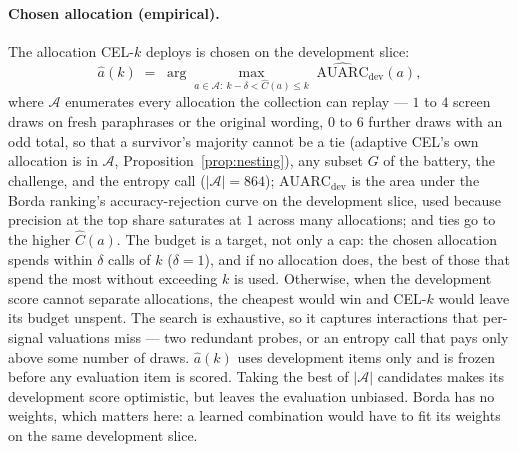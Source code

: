 \documentclass[11pt]{article}
\begin{document}
\paragraph{Chosen allocation (empirical).} The allocation CEL-$k$
deploys is chosen on the development slice:
\begin{equation}
  \hat a(k) \;=\; \arg\max_{a \in \mathcal{A}:\ k - \delta < \hat C(a) \le k}\;
  \widehat{\mathrm{AUARC}}_{\mathrm{dev}}(a),
  \label{eq:devalloc}
\end{equation}
where $\mathcal{A}$ enumerates every allocation the collection can
replay --- $1$ to $4$ screen draws on fresh paraphrases or the original
wording, $0$ to $6$ further draws with an odd total, so that a
survivor's majority cannot be a tie (adaptive CEL's own allocation is
in $\mathcal{A}$, Proposition~\ref{prop:nesting}), any subset $G$ of
the battery, the challenge, and the entropy call
($|\mathcal{A}| = 864$);
$\widehat{\mathrm{AUARC}}_{\mathrm{dev}}$ is the area under the Borda
ranking's accuracy-rejection curve on the development slice, used
because precision at the top share saturates at $1$ across many
allocations; and ties go to the higher $\hat C(a)$. The budget is a target, not only a cap: the chosen
allocation spends within $\delta$ calls of $k$ ($\delta = 1$), and if no
allocation does, the best of those that spend the most without
exceeding $k$ is used. Otherwise, when the development score cannot
separate allocations, the cheapest would win and CEL-$k$ would leave its budget unspent. The search is exhaustive, so it captures interactions that
per-signal valuations miss --- two redundant probes, or an entropy call
that pays only above some number of draws. $\hat a(k)$ uses development
items only and is frozen before any evaluation item is scored. Taking
the best of $|\mathcal{A}|$ candidates makes its development score
optimistic, but leaves the evaluation unbiased. Borda has no weights,
which matters here: a learned combination would have to fit its weights
on the same development slice.
\end{document}
